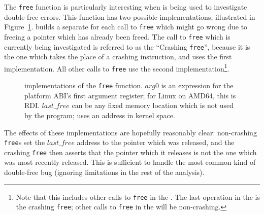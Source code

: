  The \texttt{free} function is particularly
interesting when {\technique} is being used to investigate double-free
errors.  This function has two possible implementations, illustrated
in Figure~\ref{fig:library_free}.  {\Technique} builds a separate
{\StateMachine} for each call to \texttt{free} which might go wrong
due to freeing a pointer which has already been freed.  The call to
\texttt{free} which is currently being investigated is referred to as
the ``Crashing \texttt{free}'', because it is the one which takes the
place of a crashing instruction, and uses the first implementation.
All other calls to \texttt{free} use the second
implementation\footnote{Note that this includes other calls to
  \texttt{free} in the .  The last operation
  in the  is the crashing \texttt{free};
  other calls to \texttt{free} in the  will
  be non-crashing.}.

\begin{figure}

  \caption{{\StateMachine} implementations of the \texttt{free}
    function. $arg0$ is an expression for the platform ABI's first
    argument register; for Linux on AMD64, this is RDI.
    $\mathit{last\_free}$ can be any fixed memory location which is
    not used by the program; {\implementation} uses an address in
    kernel space.}
  \label{fig:library_free}
\end{figure}

The effects of these implementations are hopefully reasonably clear:
non-crashing \texttt{free}s set the $\mathit{last\_free}$ address to
the pointer which was released, and the crashing \texttt{free} then
asserts that the pointer which it releases is not the one which was
most recently released.  This is sufficient to handle the most common
kind of double-free bug (ignoring limitations in the rest of the
analysis).  

